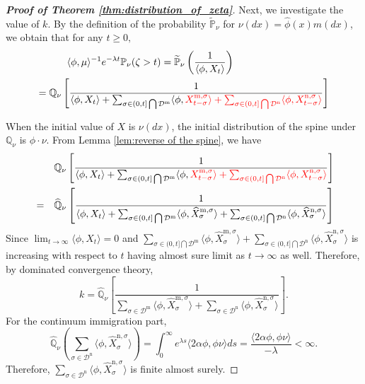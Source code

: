 \documentclass[12pt,a4paper]{amsart}
\numberwithin{equation}{section}
\theoremstyle{plain}
\theoremstyle{definition}
\begin{document}
\begin{proof}[{\bf Proof of Theorem \ref{thm:distribution_of_zeta}}]
	Next, we investigate the value of $k$.  By the definition of the probability $\widetilde{\mathbb P}_\nu$ for $\nu(dx)=\widehat\phi(x)m(dx)$, we obtain that for any $t\ge 0,$
  \begin{align}\label{eq:subcritical_equality}
    \langle\phi,\mu\rangle ^{-1}e^{-\lambda t}\mathbb P_\nu(\zeta>t)=\widetilde{\mathbb P}_\nu\left(\frac{1}{\langle\phi, X_{t}\rangle }\right)\hspace*{3.4 true cm}\\
    =\mathbb Q_{\nu}\left[\frac{1}{\langle\phi, X_{t}\rangle +\sum_{\sigma\in(0, t]\bigcap\mathcal D^{\mathrm m}}\langle \phi, {\color{red}X_{t-\sigma}^{{\mathrm m},\sigma}\rangle +\sum_{\sigma\in (0, t]\bigcap \mathcal D^{\mathrm n}}\langle \phi, X_{t-\sigma}^{{\mathrm n}, \sigma}\rangle} }\right]
  \end{align}

	When the initial value of $X$ is $\nu(dx)$, the initial distribution of the spine under $\mathbb Q_\nu$ is $\phi\cdot\nu$.
	From Lemma \ref{lem:reverse of the spine}, we have
  \begin{eqnarray*}\label{eq:duality}
    &&  \mathbb Q_{\nu}\left[\frac{1}{\langle\phi, X_{t}\rangle +\sum_{\sigma\in(0, t]\bigcap\mathcal D^{\mathrm m}}\langle \phi,{\color{red} X_{t-\sigma}^{{\mathrm m},\sigma}\rangle +\sum_{\sigma\in (0, t]\bigcap \mathcal D^{\mathrm n}}\langle \phi, X_{t-\sigma}^{{\mathrm n}, \sigma}\rangle} }\right]\\
    &=&\widehat{\mathbb Q}_{\nu}\left[\frac{1}{\langle\phi, X_{t}\rangle +\sum_{\sigma\in(0, t]\bigcap\mathcal D^{\mathrm m}}\langle \phi, \widehat X_{\sigma}^{{\mathrm m},\sigma}\rangle +\sum_{\sigma\in (0, t]\bigcap \mathcal D^{\mathrm n}}\langle \phi, \widehat X_{\sigma}^{{\mathrm n},\sigma}\rangle }\right]
  \end{eqnarray*}
  Since $\lim_{t\to\infty}\langle\phi, X_{t}\rangle=0$ and $\sum_{\sigma\in(0, t]\bigcap\mathcal D^{\mathrm m}}\langle \phi, \widehat X_{\sigma}^{{\mathrm m},\sigma}\rangle +\sum_{\sigma\in (0, t]\bigcap \mathcal D^{\mathrm n}}\langle \phi, \widehat X_{\sigma}^{{\mathrm n},\sigma}\rangle $ is increasing with respect to $t$ having almost sure limit as $t\to\infty$ as well.  Therefore, by dominated convergence theory,
  \begin{equation}\label{eq:cons}
    k=\widehat{\mathbb Q}_{\nu}\left[\frac{1}{\sum_{\sigma\in\mathcal D^{\mathrm m}}\langle \phi, \widehat X_{\sigma}^{{\mathrm m},\sigma}\rangle +\sum_{\sigma\in \mathcal D^{\mathrm n}}\langle \phi, \widehat X_{\sigma}^{{\mathrm n},\sigma}\rangle }\right].
  \end{equation}
	For the continuum immigration part,
  \[
    \widehat{\mathbb Q}_{\nu}\left(\sum_{\sigma\in \mathcal D^{\mathrm n}}\langle \phi, \widehat X_{\sigma}^{{\mathrm n},\sigma}\rangle \right)=\int_0^\infty e^{\lambda s}\langle 2\alpha\phi, \phi\nu\rangle  ds=\frac{\langle 2\alpha\phi, \phi\nu\rangle}{-\lambda}<\infty.
  \]
	Therefore, $\sum_{\sigma\in \mathcal D^{\mathrm n}}\langle \phi, \widehat X_{\sigma}^{{\mathrm n},\sigma}\rangle$ is finite almost surely.


\end{proof}
\end{document}
